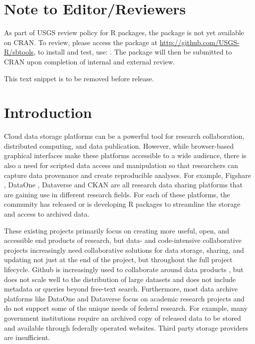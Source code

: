 
\section{Note to Editor/Reviewers}

As part of USGS review policy for R packages, the  package is not 
yet available on CRAN. To review, please access the package at 
\url{http://github.com/USGS-R/sbtools}, to install and test, use: 
. The  package will 
then be submitted to CRAN upon completion of internal and external review. 

This text snippet is to be removed before release.

\section{Introduction}

Cloud data storage platforms can be a powerful tool for research collaboration,
distributed computing, and data publication. However, while browser-based graphical
interfaces make these platforms accessible to a wide audience, there is also
a need for scripted data access and manipulation so that researchers can capture 
data provenance and create reproducible analyses. For example,
Figshare \citep{figshare}, DataOne \citep{dataone}, Dataverse \citep{dataverse} 
and CKAN \citep{ckan} are all research data
sharing platforms that are gaining use in different research fields. For each of these
platforms, the community has released \citep{rfigshare, dvn, ckanr} or is
developing \citep{dataonepkg} R packages to streamline the storage and access
to archived data. 

These existing projects primarily focus on creating more useful, open, and
accessible end products of research, but data- and code-intensive collaborative projects
increasingly need collaborative solutions for data storage, sharing, and updating
not just at the end of the project, but throughout the full project lifecycle. 
Github is increasingly used to collaborate around data products \citep{GandrudGithub}, 
but does not scale well to the distribution of large datasets \citep{Delcambre2013} and does not
include metadata or queries beyond free-text search. Furthermore, 
most data archive platforms like DataOne and Dataverse 
focus on academic research projects and do not support some
of the unique needs of federal research. For example, many government institutions
require an archived copy of released data to be stored and available through federally
operated websites. Third party storage providers are insufficient.

